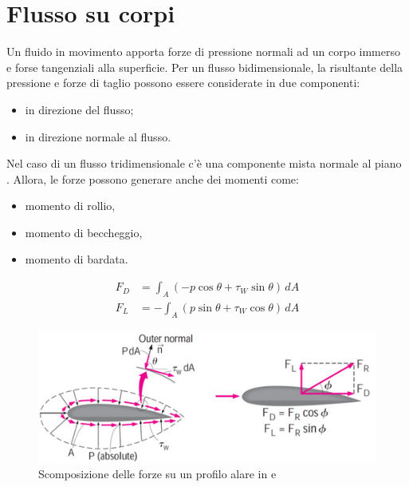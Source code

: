 \chapter{Flusso su corpi}\label{chp:FlowBodieas}

Un fluido in movimento apporta forze di pressione normali ad un corpo immerso e forse tangenziali alla superficie.
Per un flusso bidimensionale, la risultante della pressione e forze di taglio possono essere considerate in due componenti:
\begin{itemize}
\item {} in direzione del flusso;
\item {} in direzione normale al flusso.
\end{itemize}
Nel caso di un flusso tridimensionale c'è una componente mista normale al piano .
Allora, le forze possono generare anche dei momenti come:
\begin{itemize}
\item momento di rollio,
\item momento di beccheggio,
\item momento di bardata.
\end{itemize}

\begin{equation}
\begin{split}
F_D &= \int_A{\left(-p\cos\theta + \tau_W\sin\theta\right)\,dA}\\
F_L &= -\int_A{\left(p\sin\theta + \tau_W\cos\theta\right)\,dA}
\end{split}
\end{equation}

\begin{figure}
\centering
\includegraphics[width = \textwidth]{gfx/DragLift}
\caption{Scomposizione delle forze su un profilo alare in  e }
\label{fig:DragLift}
\end{figure}


